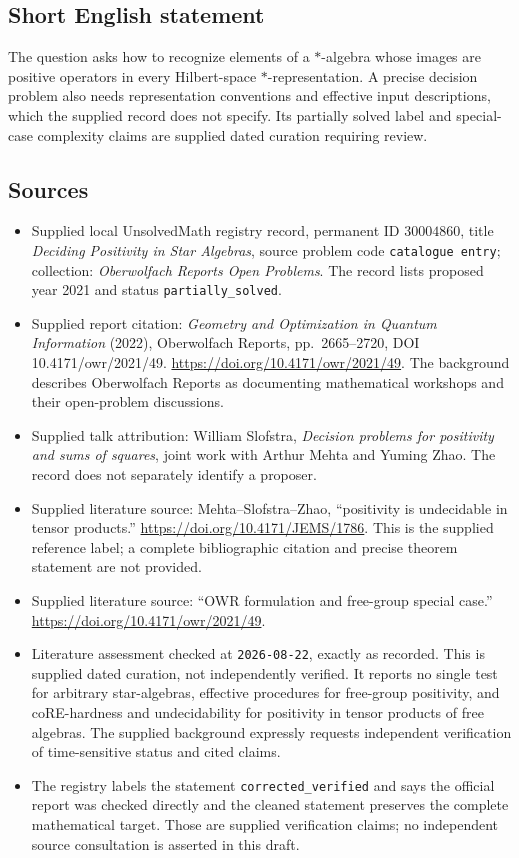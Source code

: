 \documentclass[11pt]{article}
\begin{document}
\subsection{Short English statement}
The question asks how to recognize elements of a \(*\)-algebra whose images are positive operators in every Hilbert-space \(*\)-representation. A precise decision problem also needs representation conventions and effective input descriptions, which the supplied record does not specify. Its partially solved label and special-case complexity claims are supplied dated curation requiring review.
\subsection{Sources}
\begin{itemize}
\item Supplied local UnsolvedMath registry record, permanent ID \(30004860\), title \emph{Deciding Positivity in Star Algebras}, source problem code \texttt{catalogue entry}; collection: \emph{Oberwolfach Reports Open Problems}. The record lists proposed year 2021 and status \texttt{partially\_solved}.
\item Supplied report citation: \emph{Geometry and Optimization in Quantum Information} (2022), Oberwolfach Reports, pp.\ 2665--2720, DOI 10.4171/owr/2021/49. \url{https://doi.org/10.4171/owr/2021/49}. The background describes Oberwolfach Reports as documenting mathematical workshops and their open-problem discussions.
\item Supplied talk attribution: William Slofstra, \emph{Decision problems for positivity and sums of squares}, joint work with Arthur Mehta and Yuming Zhao. The record does not separately identify a proposer.
\item Supplied literature source: Mehta--Slofstra--Zhao, ``positivity is undecidable in tensor products.'' \url{https://doi.org/10.4171/JEMS/1786}. This is the supplied reference label; a complete bibliographic citation and precise theorem statement are not provided.
\item Supplied literature source: ``OWR formulation and free-group special case.'' \url{https://doi.org/10.4171/owr/2021/49}.
\item Literature assessment checked at \texttt{2026-08-22}, exactly as recorded. This is supplied dated curation, not independently verified. It reports no single test for arbitrary star-algebras, effective procedures for free-group positivity, and coRE-hardness and undecidability for positivity in tensor products of free algebras. The supplied background expressly requests independent verification of time-sensitive status and cited claims.
\item The registry labels the statement \texttt{corrected\_verified} and says the official report was checked directly and the cleaned statement preserves the complete mathematical target. Those are supplied verification claims; no independent source consultation is asserted in this draft.
\end{itemize}
\end{document}

